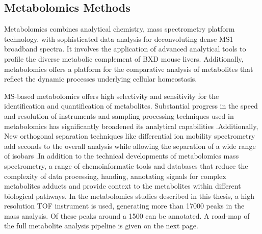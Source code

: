 \documentclass[a4paper,11pt,twoside]{book}
\begin{document}
	
	\subsection{Metabolomics Methods}
	
	Metabolomics combines analytical chemistry, mass spectrometry platform technology, with sophisticated data analysis for deconvoluting dense MS1 broadband spectra. It involves the application of advanced analytical tools to profile the diverse metabolic complement of BXD mouse livers. Additionally, metabolomics offers a platform for the comparative analysis of metabolites that reflect the dynamic processes underlying cellular homeostasis\citep{Aksenov2017GlobalSpectrometry}.
	
	MS-based metabolomics offers high selectivity and sensitivity for the identification and quantification of metabolites. Substantial progress in the speed and resolution of instruments and sampling processing techniques used in metabolomics has significantly broadened its analytical capabilities \citep{Aksenov2017GlobalSpectrometry}.Additionally, New orthogonal separation techniques like differential ion mobility spectrometry add seconds to the overall analysis while allowing the separation of a wide range of isobars \citep{Domalain2014EnantiomericSpectrometry}.In addition to the technical developments of metabolomics mass spectrometry, a range of chemoinformatic tools and databases that reduce the complexity of data processing, handing\citep{Xia2016UsingAnalysis}, annotating signals for complex metabolites adducts and provide context to the metabolites within different biological pathways\citep{Wishart2013HMDB2013,Xia2010MSEA}. In the metabolomics studies described in this thesis, a high resolution TOF instrument is used, generating more than 17000 peaks in the mass analysis. Of these peaks around a 1500 can be annotated. A road-map of the full metabolite analysis pipeline is given on the next page.
	
	
	
\end{document}
